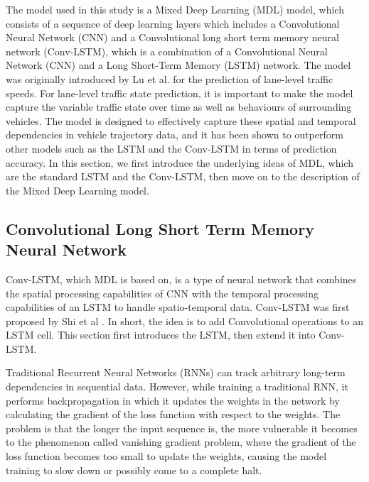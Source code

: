\documentclass[11pt]{uonthesis}
\begin{document}
The model used in this study is a Mixed Deep Learning (MDL) model, which consists of a sequence of deep learning layers which includes a Convolutional Neural Network (CNN) and a Convolutional long short term memory neural network (Conv-LSTM), which is a combination of a Convolutional Neural Network (CNN) and a Long Short-Term Memory (LSTM) network. The model was originally introduced by Lu et al. \cite{9284587} for the prediction of lane-level traffic speeds. For lane-level traffic state prediction, it is important to make the model capture the variable traffic state over time as well as behaviours of surrounding vehicles. The model is designed to effectively capture these spatial and temporal dependencies in vehicle trajectory data, and it has been shown to outperform other models such as the LSTM and the Conv-LSTM in terms of prediction accuracy. In this section, we first introduce the underlying ideas of MDL, which are the standard LSTM and the Conv-LSTM, then move on to the description of the Mixed Deep Learning model.

\subsection{Convolutional Long Short Term Memory Neural Network}
Conv-LSTM, which MDL is based on, is a type of neural network that combines the spatial processing capabilities of CNN with the temporal processing capabilities of an LSTM to handle spatio-temporal data. Conv-LSTM was first proposed by Shi et al \cite{convlstm}. In short, the idea is to add Convolutional operations to an LSTM cell. This section first introduces the LSTM, then extend it into Conv-LSTM.

Traditional Recurrent Neural Networks (RNNs) can track arbitrary long-term dependencies in sequential data. However, while training a traditional RNN, it performs backpropagation in which it updates the weights in the network by calculating the gradient of the loss function with respect to the weights. The problem is that the longer the input sequence is, the more vulnerable it becomes to the phenomenon called vanishing gradient problem, where the gradient of the loss function becomes too small to update the weights, causing the model training to slow down or possibly come to a complete halt. %
\end{document}
